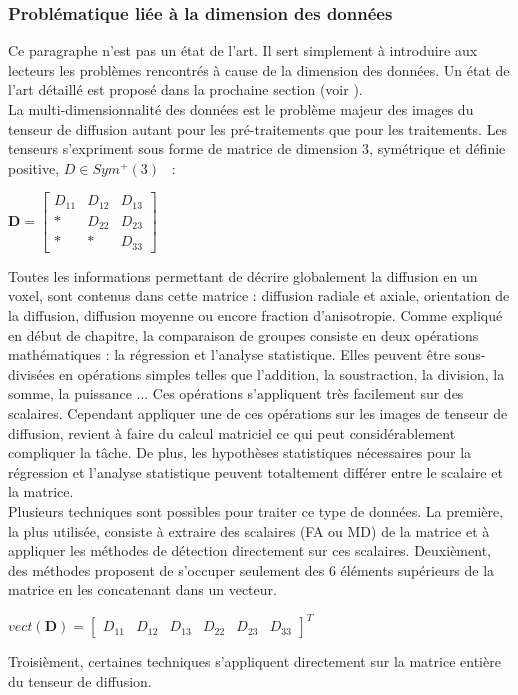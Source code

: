 \subsubsection*{Problématique liée à la dimension des données}
Ce paragraphe n'est pas un état de l'art. 
Il sert simplement à introduire aux lecteurs les problèmes rencontrés à cause de la dimension des données.
Un état de l'art détaillé est proposé dans la prochaine section (voir ).\\
La multi-dimensionnalité des données est le problème majeur des images du tenseur de diffusion autant pour les pré-traitements que pour les traitements. 
Les tenseurs s'expriment sous forme de matrice de dimension 3, symétrique et définie positive, $D \in Sym^{+}(3)$~\cite{Basser1994} :
\begin{center}
    $\textbf{D} = \left[\begin{array}{ccc}
    D_{11} & D_{12} & D_{13}\\
    * & D_{22} & D_{23}\\
    * & * & D_{33}
    \end{array}\right]$
\end{center}
Toutes les informations permettant de décrire globalement la diffusion en un voxel, sont contenus dans cette matrice : 
diffusion radiale et axiale, orientation de la diffusion, diffusion moyenne ou encore fraction d'anisotropie.
Comme expliqué en début de chapitre, la comparaison de groupes consiste en deux opérations mathématiques : la régression et l'analyse statistique.
Elles peuvent être sous-divisées en opérations simples telles que l'addition, la soustraction, la division, la somme, la puissance ...
Ces opérations s'appliquent très facilement sur des scalaires.
Cependant appliquer une de ces opérations sur les images de tenseur de diffusion, revient à faire du calcul matriciel ce qui peut considérablement compliquer la tâche.
De plus, les hypothèses statistiques nécessaires pour la régression et l'analyse statistique peuvent totaltement différer entre le scalaire et la matrice.\\
Plusieurs techniques sont possibles pour traiter ce type de données. 
La première, la plus utilisée, consiste à extraire des scalaires (FA ou MD) de la matrice et à appliquer les méthodes de détection directement sur ces scalaires.
Deuxièment, des méthodes proposent de s'occuper seulement des 6 éléments supérieurs de la matrice en les concatenant dans un vecteur.
\begin{center}
    $vect(\textbf{D}) = \left[\begin{array}{cccccc}
    D_{11} & D_{12} & D_{13} & D_{22} & D_{23} & D_{33}
    \end{array}\right]^{T}$
\end{center}
Troisièment, certaines techniques s'appliquent directement sur la matrice entière du tenseur de diffusion.
